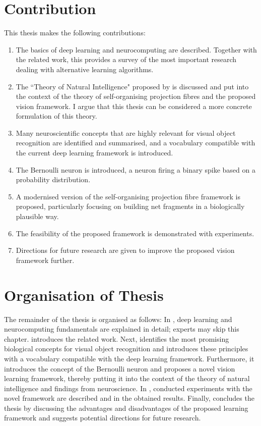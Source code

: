 \section{Contribution}
This thesis makes the following contributions:
\begin{enumerate}
	\item The basics of deep learning and neurocomputing are described. Together with the related work, this provides a survey of the most important research dealing with alternative learning algorithms.
	\item The ``Theory of Natural Intelligence" proposed by  is discussed and put into the context of the theory of self-organising projection fibres  and the proposed vision framework. I argue that this thesis can be considered a more concrete formulation of this theory.
    \item Many neuroscientific concepts that are highly relevant for visual object recognition are identified and summarised, and a vocabulary compatible with the current deep learning framework is introduced.
	\item The Bernoulli neuron is introduced, a neuron firing a binary spike based on a probability distribution.
	\item A modernised version of the self-organising projection fibre framework is proposed, particularly focusing on building net fragments in a biologically plausible way.
    \item The feasibility of the proposed framework is demonstrated with experiments.
    \item Directions for future research are given to improve the proposed vision framework further.
\end{enumerate}


\section{Organisation of Thesis}
The remainder of the thesis is organised as follows: In , deep learning and neurocomputing fundamentals are explained in detail; experts may skip this chapter.
 introduces the related work. Next,  identifies the most promising biological concepts for visual object recognition and introduces these principles with a vocabulary compatible with the deep learning framework.
Furthermore, it introduces the concept of the Bernoulli neuron and proposes a novel vision learning framework, thereby putting it into the context of the theory of natural intelligence and findings from neuroscience.
In , conducted experiments with the novel framework are described and in  the obtained results.
Finally,  concludes the thesis by discussing the advantages and disadvantages of the proposed learning framework and suggests potential directions for future research.
